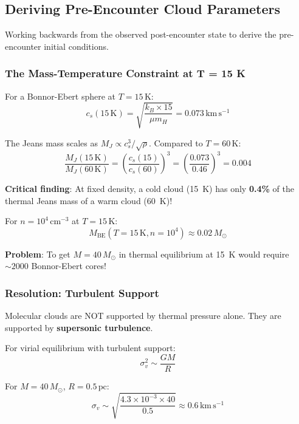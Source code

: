 \documentclass[11pt,a4paper]{article}
\newcommand{\Msun}{M_\odot}
\newcommand{\kms}{\,\mathrm{km\,s^{-1}}}
\newcommand{\pc}{\,\mathrm{pc}}
\newcommand{\cmcubed}{\,\mathrm{cm^{-3}}}
\begin{document}
\subsection{Deriving Pre-Encounter Cloud Parameters}

Working backwards from the observed post-encounter state to derive the
pre-encounter initial conditions.

\subsubsection{The Mass-Temperature Constraint at T = 15 K}

For a Bonnor-Ebert sphere at $T = 15\,\mathrm{K}$:
\begin{equation}
    c_s(15\,\mathrm{K}) = \sqrt{\frac{k_B \times 15}{\mu m_H}} = 0.073\kms
\end{equation}

The Jeans mass scales as $M_J \propto c_s^3 / \sqrt{\rho}$.
Compared to $T = 60\,\mathrm{K}$:
\begin{equation}
    \frac{M_J(15\,\mathrm{K})}{M_J(60\,\mathrm{K})} = \left(\frac{c_s(15)}{c_s(60)}\right)^3
    = \left(\frac{0.073}{0.46}\right)^3 = 0.004
\end{equation}

\textbf{Critical finding}: At fixed density, a cold cloud (15~K) has only
\textbf{0.4\%} of the thermal Jeans mass of a warm cloud (60~K)!

For $n = 10^4\cmcubed$ at $T = 15\,\mathrm{K}$:
\begin{equation}
    M_\mathrm{BE}(T=15\,\mathrm{K}, n=10^4) \approx 0.02\,\Msun
\end{equation}

\textbf{Problem}: To get $M = 40\,\Msun$ in thermal equilibrium at 15~K would require
$\sim 2000$ Bonnor-Ebert cores!

\subsubsection{Resolution: Turbulent Support}

Molecular clouds are NOT supported by thermal pressure alone. They are supported
by \textbf{supersonic turbulence}.

For virial equilibrium with turbulent support:
\begin{equation}
    \sigma_v^2 \sim \frac{G M}{R}
\end{equation}

For $M = 40\,\Msun$, $R = 0.5\pc$:
\begin{equation}
    \sigma_v \sim \sqrt{\frac{4.3 \times 10^{-3} \times 40}{0.5}} \approx 0.6\kms
\end{equation}
\end{document}
